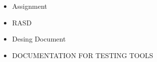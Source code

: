 \begin{itemize}
\item Assignment
\item RASD
\item Desing Document
\item \begin{Huge}
DOCUMENTATION FOR TESTING TOOLS
\end{Huge}
\end{itemize}
